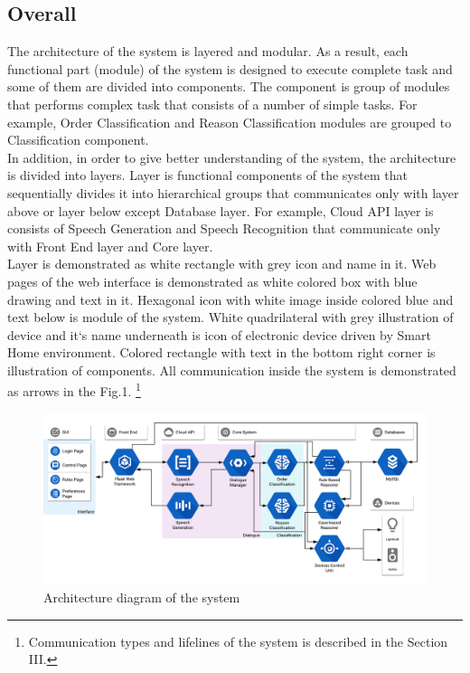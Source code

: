 \documentclass{llncs}
\begin{document}
    \subsection{Overall}
    The architecture of the system is layered and modular.
    As a result, each functional part (module) of the system is designed to execute complete task and some of them are
    divided into components.
    The component is group of modules that performs complex task that consists of a number of simple tasks.
    For example, Order Classification and Reason Classification modules are grouped to Classification component.\\
    In addition, in order to give better understanding of the system, the architecture is divided into layers.
    Layer is functional components of the system that sequentially divides it into hierarchical groups that
    communicates only with layer above or layer below except Database layer.
    For example, Cloud API layer is consists of Speech Generation and Speech Recognition that communicate only with
    Front End layer and Core layer.\\
    Layer is demonstrated as white rectangle with grey icon and name in it.
    Web pages of the web interface is demonstrated as white colored box with blue drawing and text in it.
    Hexagonal icon with white image inside colored blue and text below is module of the system.
    White quadrilateral with grey illustration of device and it`s name underneath is icon of electronic device driven
    by Smart Home environment.
    Colored rectangle with text in the bottom right corner is illustration of components.
    All communication inside the system is demonstrated as arrows in the Fig.1.
    \footnote{Communication types and lifelines of the system is described in the Section III.}
    \begin{figure}
        \includegraphics[width=\textwidth]{arch.png}
        \caption[]{Architecture diagram of the system}
    \end{figure}
\end{document}
